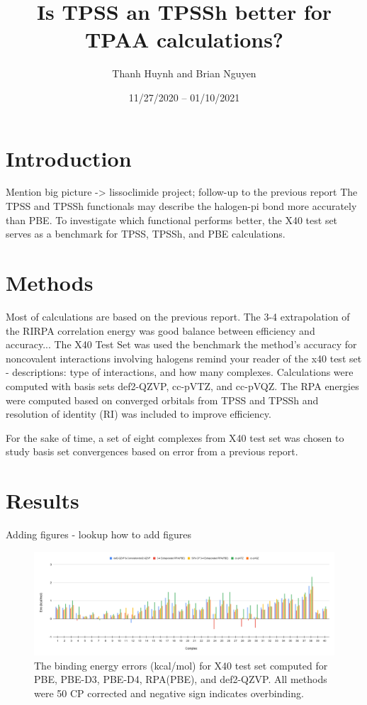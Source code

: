\documentclass[11pt]{article}
\title{\textbf{Is TPSS an TPSSh better for TPAA calculations?}}
\author{Thanh Huynh and Brian Nguyen}
\date{11/27/2020 -- 01/10/2021 }
\newcommand{\brian}[1]{{\color{orange} #1}}
\begin{document}
\maketitle

\section{Introduction}

\brian{Mention big picture -> lissoclimide project; follow-up to the
  previous report}
The TPSS and TPSSh functionals may describe the halogen-pi bond more
accurately than PBE. To investigate which functional performs better,
the X40 test set serves as a benchmark for TPSS, TPSSh, and PBE 
calculations.  


\section{Methods}

\brian{Most of calculations are based on the previous report. The 3-4
  extrapolation of the RIRPA correlation energy was good balance between
  efficiency and accuracy...}
The X40 Test Set was used the benchmark the method's accuracy for 
noncovalent interactions involving halogens \brian{remind your reader
  of the x40 test set - descriptions: type of interactions, and how
  many complexes}. Calculations were computed
with basis sets def2-QZVP, cc-pVTZ, and cc-pVQZ. The RPA energies were
computed based on converged orbitals from TPSS and TPSSh and resolution
of identity (RI) was included to improve efficiency. 

\brian{For the sake of time,} a set of eight complexes from X40 test set
was chosen to study basis set convergences based on error from a previous
report. 

\section{Results}

\brian{Adding figures - lookup how to add figures}

\begin{figure}
  \includegraphics[scale=0.25]{def2-QZVP_error.png}
  \caption{The binding energy errors (kcal/mol) for X40 test set computed
    for PBE, PBE-D3, PBE-D4, RPA(PBE), and def2-QZVP. All methods were 50
    CP corrected and negative sign indicates overbinding.}
  \label{fig:<name>}
\end{figure}
\end{document}
